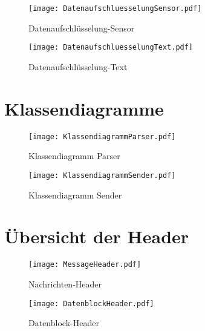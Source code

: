 \begin{figure}[H]
	\centering
	\texttt{[image: DatenaufschluesselungSensor.pdf]}
	\caption{Datenaufschlüsselung-Sensor}
\end{figure}

\begin{figure}[H]
	\centering
	\texttt{[image: DatenaufschluesselungText.pdf]}
	\caption{Datenaufschlüsselung-Text}
\end{figure}

\section{Klassendiagramme}
\label{sec:klassendiagramme}

\begin{figure}[H]
	\centering
	\texttt{[image: KlassendiagrammParser.pdf]}
	\caption{Klassendiagramm Parser}
	\label{fig:KlassendiagrammParser}
\end{figure}

\newpage

\begin{figure}[H]
	\centering
	\texttt{[image: KlassendiagrammSender.pdf]}
	\caption{Klassendiagramm Sender}
	\label{fig:KlassendiagrammSender}
\end{figure}

\section{Übersicht der Header}
\label{sec:HeaderUebersicht}

\begin{figure}[H]
	\centering
	\texttt{[image: MessageHeader.pdf]}
	\caption{Nachrichten-Header}
	\label{fig:NachrichtenHeader}
\end{figure}

\newpage

\begin{figure}[H]
	\centering
	\texttt{[image: DatenblockHeader.pdf]}
	\caption{Datenblock-Header}
	\label{fig:DatenblockHeader}
\end{figure}